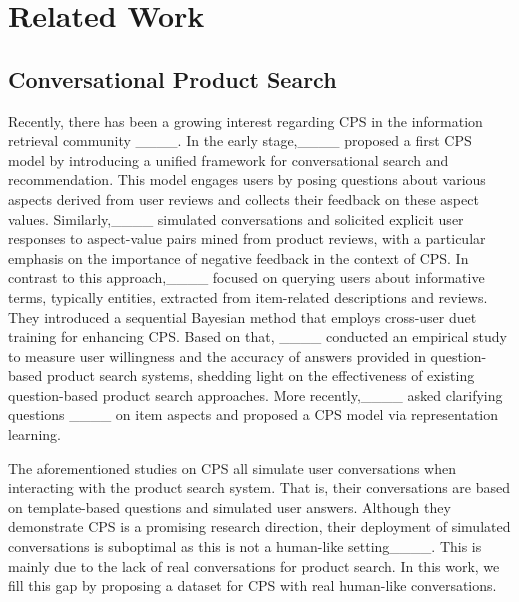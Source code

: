\section{Related Work}
\subsection{Conversational Product Search}
Recently, there has been a growing interest regarding \ac{CPS} in the information retrieval community ____. In the early stage,____ proposed a first \ac{CPS} model by introducing a unified framework for conversational search and recommendation. %
This model engages users by posing questions about various aspects derived from user reviews and collects their feedback on these aspect values. Similarly,____ simulated conversations and solicited explicit user responses to aspect-value pairs mined from product reviews, with a particular emphasis on the importance of negative feedback in the context of \ac{CPS}. In contrast to this approach,____ focused on querying users about informative terms, typically entities, extracted from item-related descriptions and reviews. They introduced a sequential Bayesian method that employs cross-user duet training for enhancing \ac{CPS}. Based on that, ____ conducted an empirical study to measure user willingness and the accuracy of answers provided in question-based product search systems, shedding light on the effectiveness of existing question-based product search approaches. More recently,____ asked clarifying questions ____ on item aspects and proposed a \ac{CPS} model via representation learning. 

The aforementioned studies on \ac{CPS} all simulate user conversations when interacting with the product search system. That is, their conversations are based on template-based questions and simulated user answers. Although they demonstrate CPS is a promising research direction,
their deployment of simulated conversations is suboptimal as this is not a human-like setting____. This is mainly due to the lack of real conversations for product search. In this work, we fill this gap by proposing a dataset for \ac{CPS} with real human-like conversations. 
